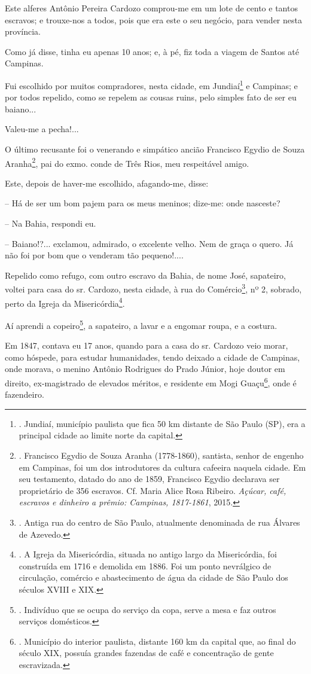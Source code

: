 Este alferes Antônio Pereira Cardozo comprou-me em um lote de cento e
tantos escravos; e trouxe-nos a todos, pois que era este o seu negócio,
para vender nesta província.

Como já disse, tinha eu apenas 10 anos; e, à pé, fiz toda a viagem de
Santos até Campinas.

Fui escolhido por muitos compradores, nesta cidade, em Jundiaí\footnote{.
  Jundiaí, município paulista que fica 50 km distante de São Paulo (SP),
  era a principal cidade ao limite norte da capital.} e Campinas; e por
todos repelido, como se repelem as cousas ruins, pelo simples fato de
ser eu {baiano}...

Valeu-me a pecha!...

O último recusante foi o venerando e simpático ancião Francisco Egydio
de Souza Aranha\footnote{. Francisco Egydio de Souza Aranha (1778-1860),
  santista, senhor de engenho em Campinas, foi um dos introdutores da
  cultura cafeeira naquela cidade. Em seu testamento, datado do ano de
  1859, Francisco Egydio declarava ser proprietário de 356 escravos. Cf.
  Maria Alice Rosa Ribeiro. \emph{Açúcar, café, escravos e dinheiro a
  prêmio: Campinas, 1817-1861}, 2015.}, pai do exmo. conde de Três Rios,
meu respeitável amigo.

Este, depois de haver-me escolhido, afagando-me, disse:

-- Há de ser um bom pajem para os meus meninos; dize-me: onde nasceste?

-- Na Bahia, respondi eu.

-- {Baiano}!?... exclamou, admirado, o excelente velho. Nem de graça o
quero. Já não foi por bom que o venderam tão pequeno!....

Repelido {como refugo}, com outro escravo da Bahia, de nome José,
sapateiro, voltei para casa do sr. Cardozo, nesta cidade, à rua do
Comércio\footnote{. Antiga rua do centro de São Paulo, atualmente
  denominada de rua Álvares de Azevedo.}, nº 2, sobrado, perto da Igreja
da Misericórdia\footnote{. A Igreja da Misericórdia, situada no antigo
  largo da Misericórdia, foi construída em 1716 e demolida em 1886. Foi
  um ponto nevrálgico de circulação, comércio e abastecimento de água da
  cidade de São Paulo dos séculos XVIII e XIX.}.

Aí aprendi a copeiro\footnote{. Indivíduo que se ocupa do serviço da
  copa, serve a mesa e faz outros serviços domésticos.}, a sapateiro, a
lavar e a engomar roupa, e a costura.

Em 1847, contava eu 17 anos, quando para a casa do sr. Cardozo veio
morar, como hóspede, para estudar humanidades, tendo deixado a cidade de
Campinas, onde morava, o menino Antônio Rodrigues do Prado Júnior, hoje
doutor em direito, ex-magistrado de elevados méritos, e residente em
Mogi Guaçu\footnote{. Município do interior paulista, distante 160 km da
  capital que, ao final do século XIX, possuía grandes fazendas de café
  e concentração de gente escravizada.}, onde é fazendeiro.

